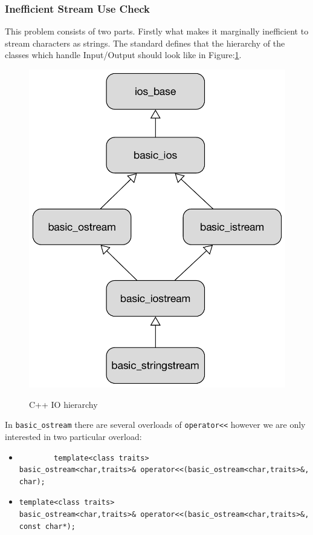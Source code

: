 \subsubsection{Inefficient Stream Use Check}
\par This problem consists of two parts. Firstly what makes it marginally inefficient to stream characters as strings. The standard defines that the hierarchy of the classes which handle Input/Output should look like in Figure:\ref{cpp_io_hierarch}. 
\begin{figure}[H]
	\caption{C++ IO hierarchy}
	\centering
	\includegraphics[scale=0.6]{images/cpp_io_structure.pdf}
	\label{cpp_io_hierarch}
\end{figure}
\par In \verb|basic_ostream| there are several overloads of \verb|operator<<| however we are only interested in two particular overload:
\begin{itemize}
	\item \begin{verbatim}
		template<class traits>
basic_ostream<char,traits>& operator<<(basic_ostream<char,traits>&,
char);
	\end{verbatim}
	\item \begin{verbatim}
template<class traits>
basic_ostream<char,traits>& operator<<(basic_ostream<char,traits>&,
const char*);
\end{verbatim}
\end{itemize}\cite[\S27.7.3.6.4]{cpp_standard}
